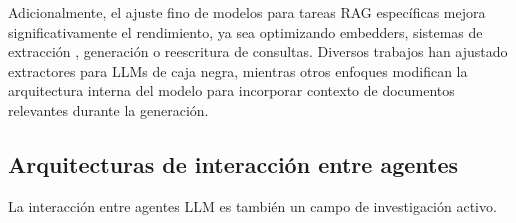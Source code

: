 Adicionalmente, el ajuste fino de modelos para tareas RAG específicas mejora significativamente el rendimiento, ya sea optimizando embedders\cite{xiong_approximate_2020}, sistemas de extracción \cite{khattab_relevance-guided_2021}\cite{izacard_atlas_2022}, generación\cite{asai_self-rag_2024}\cite{krishna_rankgen_2022} o reescritura de consultas\cite{ma_query_nodate}. Diversos trabajos han ajustado extractores para LLMs de caja negra\cite{yu_augmentation-adapted_2023}\cite{shi_replug_2023}\cite{lin_ra-dit_2024}\cite{yang_prca_2023}, mientras otros enfoques modifican la arquitectura interna del modelo para incorporar contexto de documentos relevantes durante la generación\cite{guu_realm_2020}.










\subsection{Arquitecturas de interacción entre agentes}
La interacción entre agentes LLM es también un campo de investigación activo. 










